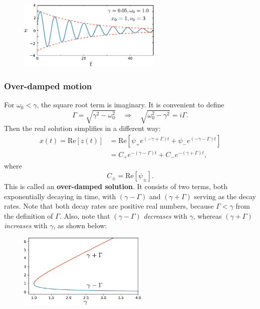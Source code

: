 \documentclass[10pt,a4paper]{article}
\begin{document}
\begin{figure}[ht]
  \centering\includegraphics[width=0.61\textwidth]{underdamped}
\end{figure}

\subsubsection{Over-damped motion}
\label{overdamped}

For $\omega_0 < \gamma$, the square root term is imaginary. It is
convenient to define
\begin{equation}
\Gamma = \sqrt{\gamma^2 - \omega_0^2} \quad \Rightarrow \quad \sqrt{\omega_0^2 - \gamma^2} = i \Gamma.
\end{equation}
Then the real solution simplifies in a different way:
\begin{align}
  x(t) = \mathrm{Re}\left[z(t)\right]
  &= \mathrm{Re}\left[\psi_+ e^{\left(-\gamma  + \Gamma\right)t} + \psi_- e^{\left(-\gamma - \Gamma\right)t} \right] \\
  &= C_+ e^{-(\gamma - \Gamma) t} + C_- e^{-(\gamma + \Gamma) t},
  \label{overdamped-sol}
\end{align}
where
\begin{equation}
C_\pm = \mathrm{Re}[\psi_\pm].
\end{equation}
This is called an \textbf{over-damped solution}.  It consists of two
terms, both exponentially decaying in time, with $(\gamma-\Gamma)$ and
$(\gamma + \Gamma)$ serving as the decay rates. Note that both decay
rates are positive real numbers, because $\Gamma < \gamma$ from the
definition of $\Gamma$.  Also, note that $(\gamma - \Gamma)$
\emph{decreases} with $\gamma$, whereas $(\gamma + \Gamma)$
\emph{increases} with $\gamma$, as shown below:

\begin{figure}[ht]
  \centering\includegraphics[width=0.55\textwidth]{decay_rates}
\end{figure}
\end{document}
